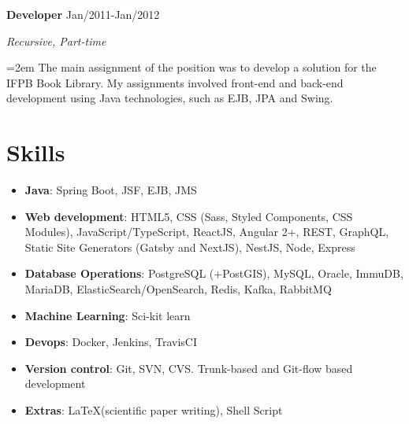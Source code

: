 \documentclass[a4paper,10pt]{article}
\newcommand{\sepspace}{\vspace*{0.75em}}
\newcommand{\NewPart}[1]{\section*{\large{#1}}}
\newcommand{\EducationEntry}[4]{
		\noindent \textbf{#1} \hfill 					%
		\colorbox{White}{%
			\parbox{6em}{%
			\hfill\color{Black}#2}} \par				%
		\noindent \textit{#3} \par						%
		\noindent \hangindent=0em\hangafter=0 \normalsize #4 	%
		\normalsize \par
		\vspace{0.5em}
	}
\newcommand{\WorkEntry}[4]{								%
		\noindent \textbf{#1} \hfill 					%
		\colorbox{White}{\color{Black}#2} \par			%
		\noindent \textit{#3} \par						%
		\noindent\hangindent=2em\hangafter=0 \normalsize #4 	%
		\normalsize \par
		\vspace{0.5em}
	}
\begin{document}
\WorkEntry{Developer}{Jan/2011-Jan/2012}{Recursive, Part-time}{The main assignment of the position was to develop a solution for the IFPB Book Library. My assignments involved front-end and back-end development using Java technologies, such as EJB, JPA and Swing.}


\NewPart{Skills}
\begin{multicols}{2}
\begin{itemize}
    \linespread{1}
    \item \textbf{Java}: Spring Boot, JSF, EJB, JMS
    \item \textbf{Web development}: HTML5, CSS (Sass, Styled Components, CSS Modules), JavaScript/TypeScript, ReactJS, Angular 2+, REST, GraphQL, Static Site Generators (Gatsby and NextJS), NestJS, Node, Express
    \item \textbf{Database Operations}: PostgreSQL (+PostGIS), MySQL, Oracle, ImmuDB, MariaDB, ElasticSearch/OpenSearch, Redis, Kafka, RabbitMQ
    \item \textbf{Machine Learning}: Sci-kit learn
    \item \textbf{Devops}: Docker, Jenkins, TravisCI
    \item \textbf{Version control}: Git, SVN, CVS. Trunk-based and Git-flow based development
    \item \textbf{Extras}: \LaTeX (scientific paper writing), Shell Script
\end{itemize}
\end{multicols}



\sepspace


\sepspace




\end{document}
